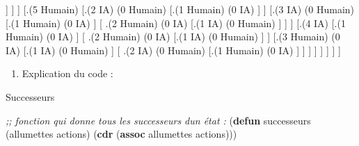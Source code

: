 \documentclass[
]{article}
\newenvironment{Shaded}{}{}
\newcommand{\CommentTok}[1]{\textcolor[rgb]{0.38,0.63,0.69}{\textit{#1}}}
\newcommand{\FunctionTok}[1]{\textcolor[rgb]{0.02,0.16,0.49}{#1}}
\newcommand{\KeywordTok}[1]{\textcolor[rgb]{0.00,0.44,0.13}{\textbf{#1}}}
\newcommand{\NormalTok}[1]{#1}
\providecommand{\tightlist}{%
  \setlength{\itemsep}{0pt}\setlength{\parskip}{0pt}}
\begin{document}
\begin{inctext}
                    [ .{(2  Humain)} 
                    {(0 IA)} 
                    [.{(1 IA)} 
                    {(0 Humain)} ] ]   ] ] 
        [.{(5 Humain)}  
            [.{(2  IA)} 
            {(0 Humain)} 
            [.{(1 Humain)} 
            {(0 IA)} ] ] 
            [.{(3 IA)} 
                {(0 Humain)} 
                [.{(1 Humain)} 
                    {(0 IA)} ] 
                    [ .{(2  Humain)} 
                    {(0 IA)} 
                    [.{(1 IA)} 
                    {(0 Humain)} ] ]   ] 
                    [.{(4 IA)}  
                    [.{(1 Humain)} 
                    {(0 IA)} ]
                    [ .{(2  Humain)} 
                    {(0 IA)} 
                    [.{(1 IA)} 
                    {(0 Humain)} ] ]
                    [.{(3 Humain)} 
                    {(0 IA)} 
                    [.{(1 IA)} 
                        {(0 Humain)} ] 
                        [ .{(2  IA)} 
                        {(0 Humain)} 
                        [.{(1 Humain)} 
                        {(0 IA)} ] ]  ] ]  ]  ]  ]  ]
                        
                        
                    \end{inctext}
                    

                    
                    \begin{enumerate}
\def\labelenumi{\arabic{enumi}.}
\setcounter{enumi}{2}
\tightlist
\item
Explication du code :
\end{enumerate}

\begin{Shaded}
    \begin{algorithm}[H]
        \caption{Successeurs}
        \begin{Highlighting}[]
            
            \CommentTok{;; fonction qui donne tous les successeurs d\textquotesingle{}un état :}
            \NormalTok{(}\KeywordTok{defun}\FunctionTok{ successeurs }\NormalTok{(allumettes actions)}
            \NormalTok{  (}\KeywordTok{cdr}\NormalTok{ (}\KeywordTok{assoc}\NormalTok{ allumettes actions)))}
        \end{Highlighting}
\end{algorithm}
\end{Shaded}
\end{document}

